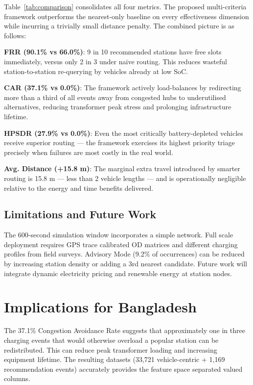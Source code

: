 \documentclass[conference]{IEEEtran}
\begin{document}
Table~\ref{tab:comparison} consolidates all four metrics. The proposed
multi-criteria framework outperforms the nearest-only baseline on every
effectiveness dimension while incurring a trivially small distance
penalty. The combined picture is as follows:

\textbf{FRR (90.1\% vs 66.0\%)}: 9 in 10 recommended stations have
free slots immediately, versus only 2 in 3 under naive routing. This
reduces wasteful station-to-station re-querying by vehicles already at
low SoC.

\textbf{CAR (37.1\% vs 0.0\%)}: The framework actively load-balances
by redirecting more than a third of all events away from congested hubs
to underutilised alternatives, reducing transformer peak stress and
prolonging infrastructure lifetime.

\textbf{HPSDR (27.9\% vs 0.0\%)}: Even the most critically
battery-depleted vehicles receive superior routing --- the framework
exercises its highest priority triage precisely when failures are most
costly in the real world.

\textbf{Avg. Distance (+15.8 m)}: The marginal extra travel introduced
by smarter routing is 15.8 m --- less than 2 vehicle lengths --- and is
operationally negligible relative to the energy and time benefits
delivered.

\subsection{Limitations and Future Work}

The 600-second simulation window incorporates a simple network. Full
scale deployment requires GPS trace calibrated OD matrices and different
charging profiles from field surveys. Advisory Mode (9.2\% of
occurrences) can be reduced by increasing station density or adding a
3rd nearest candidate. Future work will integrate dynamic electricity
pricing and renewable energy at station nodes.

\section{Implications for Bangladesh}

The 37.1\% Congestion Avoidance Rate suggests that approximately one in
three charging events that would otherwise overload a popular station
can be redistributed. This can reduce peak transformer loading and
increasing equipment lifetime. The resulting datasets (33,721
vehicle-centric + 1,169 recommendation events) accurately provides the
feature space separated valued columns.
\end{document}
